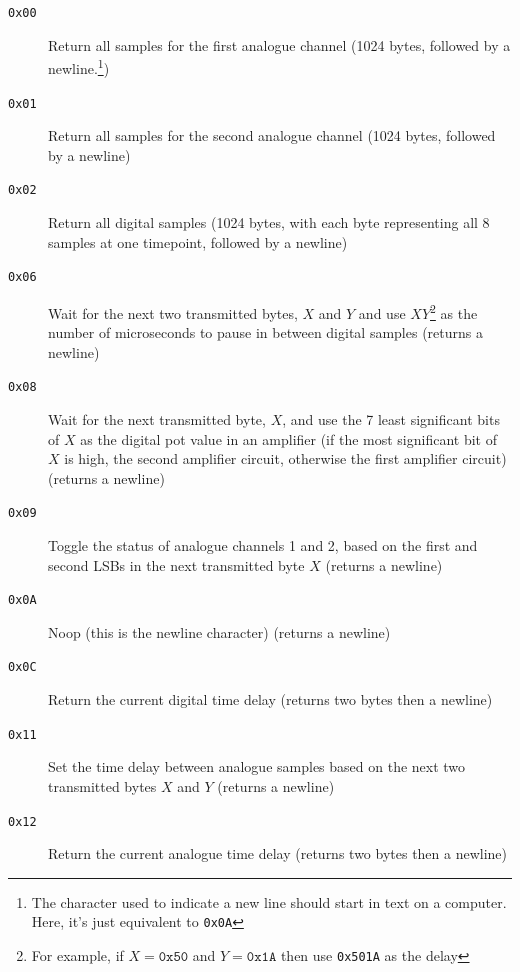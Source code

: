 \begin{description}

  \item[\texttt{0x00}] Return all samples for the first analogue channel (1024
  bytes, followed by a newline.\footnote{The character used to indicate a new
  line should start in text on a computer. Here, it's just equivalent to
  \texttt{0x0A}})

  \item[\texttt{0x01}] Return all samples for the second analogue channel (1024
  bytes, followed by a newline)

  \item[\texttt{0x02}] Return all digital samples (1024 bytes, with each byte
    representing all 8 samples at one timepoint, followed by a newline)

  \item[\texttt{0x06}] Wait for the next two transmitted bytes, $X$ and $Y$ and
  use $XY$\footnote{For example, if $X = \texttt{0x50}$ and $Y=\texttt{0x1A}$
  then use \texttt{0x501A} as the delay} as the number of microseconds to pause
  in between digital samples (returns a newline)

  \item[\texttt{0x08}] Wait for the next transmitted byte, $X$, and use the 7
  least significant bits of $X$ as the digital pot value in an amplifier (if the
  most significant bit of $X$ is high, the second amplifier circuit, otherwise
  the first amplifier circuit) (returns a newline)

  \item[\texttt{0x09}] Toggle the status of analogue channels 1 and 2, based on
    the first and second LSBs in the next transmitted byte $X$ (returns a
    newline)

  \item[\texttt{0x0A}] Noop (this is the newline character) (returns a newline)

  \item[\texttt{0x0C}] Return the current digital time delay (returns two bytes
    then a newline)

  \item[\texttt{0x11}] Set the time delay between analogue samples based on the
    next two transmitted bytes $X$ and $Y$ (returns a newline)

  \item[\texttt{0x12}] Return the current analogue time delay (returns two bytes
    then a newline)

\end{description}

